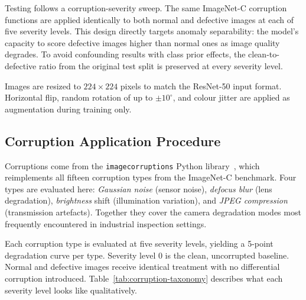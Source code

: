 Testing follows a corruption-severity sweep. The same ImageNet-C corruption functions are applied identically to both normal and defective images at each of five severity levels. This design directly targets anomaly separability: the model's capacity to score defective images higher than normal ones as image quality degrades. To avoid confounding results with class prior effects, the clean-to-defective ratio from the original test split is preserved at every severity level.

Images are resized to $224 \times 224$ pixels to match the ResNet-50 input format. Horizontal flip, random rotation of up to $\pm10^{\circ}$, and colour jitter are applied as augmentation during training only.

\subsection{Corruption Application Procedure}

Corruptions come from the \texttt{imagecorruptions} Python library~\autocite{Hendrycks2019}, which reimplements all fifteen corruption types from the ImageNet-C benchmark. Four types are evaluated here: \textit{Gaussian noise} (sensor noise), \textit{defocus blur} (lens degradation), \textit{brightness} shift (illumination variation), and \textit{JPEG compression} (transmission artefacts). Together they cover the camera degradation modes most frequently encountered in industrial inspection settings.

Each corruption type is evaluated at five severity levels, yielding a 5-point degradation curve per type. Severity level 0 is the clean, uncorrupted baseline. Normal and defective images receive identical treatment with no differential corruption introduced. Table~\ref{tab:corruption-taxonomy} describes what each severity level looks like qualitatively.

